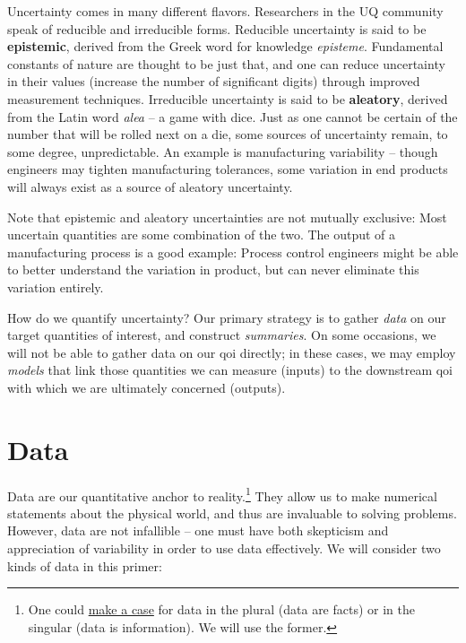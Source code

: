 \documentclass[../primer.tex]{subfiles}
\begin{document}
Uncertainty comes in many different flavors. Researchers in the UQ community
speak of reducible and irreducible forms. Reducible uncertainty is said to be
\textbf{epistemic}, derived from the Greek word for knowledge \emph{episteme}.
Fundamental constants of nature are thought to be just that, and one can reduce
uncertainty in their values (increase the number of significant digits) through
improved measurement techniques. Irreducible uncertainty is said to be
\textbf{aleatory}, derived from the Latin word \emph{alea} -- a game with dice.
Just as one cannot be certain of the number that will be rolled next on a die,
some sources of uncertainty remain, to some degree, unpredictable. An example is
manufacturing variability -- though engineers may tighten manufacturing
tolerances, some variation in end products will always exist as a source of
aleatory uncertainty.

Note that epistemic and aleatory uncertainties are not mutually exclusive: Most
uncertain quantities are some combination of the two. The output of a
manufacturing process is a good example: Process control engineers might be able
to better understand the variation in product, but can never eliminate this
variation entirely.

How do we quantify uncertainty? Our primary strategy is to gather \emph{data} on
our target quantities of interest, and construct \emph{summaries}. On some
occasions, we will not be able to gather data on our qoi directly; in these
cases, we may employ \emph{models} that link those quantities we can measure
(inputs) to the downstream qoi with which we are ultimately concerned (outputs).

\section{Data} \label{sec:data}
Data are our quantitative anchor to reality.\footnote{One could
  \href{http://phdcomics.com/comics.php?f=1816}{make a case} for data in the
  plural (data are facts) or in the singular (data is information). We will use
  the former.} They allow us to make numerical statements about the physical
world, and thus are invaluable to solving problems. However, data are not
infallible -- one must have both skepticism and appreciation of variability in
order to use data effectively. We will consider two kinds of data in this
primer:
\end{document}
